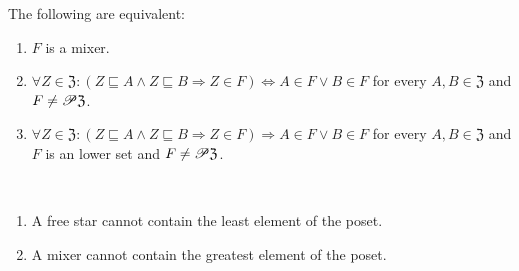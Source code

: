 \begin{cor}
The following are equivalent:
\begin{enumerate}
\item $F$ is a mixer.
\item $\forall Z\in\mathfrak{Z}:(Z\sqsubseteq A\wedge Z\sqsubseteq B\Rightarrow Z\in F)\Leftrightarrow A\in F\vee B\in F$
for every $A,B\in\mathfrak{Z}$ and $F\neq\mathscr{P}\mathfrak{Z}$.
\item $\forall Z\in\mathfrak{Z}:(Z\sqsubseteq A\wedge Z\sqsubseteq B\Rightarrow Z\in F)\Rightarrow A\in F\vee B\in F$
for every $A,B\in\mathfrak{Z}$ and $F$ is an lower set and $F\neq\mathscr{P}\mathfrak{Z}$.
\end{enumerate}
\end{cor}
\begin{obvious}
~
\begin{enumerate}
\item A free star cannot contain the least element of the poset.
\item A mixer cannot contain the greatest element of the poset.
\end{enumerate}
\end{obvious}

